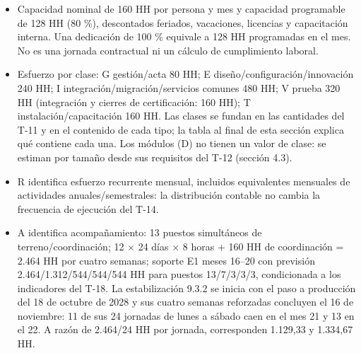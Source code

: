 \begin{itemize}
\item Capacidad nominal de 160 HH por persona y mes y capacidad programable de 128 HH (80 \%), descontados feriados, vacaciones, licencias y capacitación interna. Una dedicación de 100 \% equivale a 128 HH programadas en el mes. No es una jornada contractual ni un cálculo de cumplimiento laboral.
\item Esfuerzo por clase: G gestión/acta 80 HH; E diseño/configuración/innovación 240 HH; I integración/migración/servicios comunes 480 HH; V prueba 320 HH (integración y cierres de certificación: 160 HH); T instalación/capacitación 160 HH. Las clases se fundan en las cantidades del T-11 y en el contenido de cada tipo; la tabla al final de esta sección explica qué contiene cada una. Los módulos (D) no tienen un valor de clase: se estiman por tamaño desde sus requisitos del T-12 (sección 4.3).
\item R identifica esfuerzo recurrente mensual, incluidos equivalentes mensuales de actividades anuales/semestrales: la distribución contable no cambia la frecuencia de ejecución del T-14.
\item A identifica acompañamiento: 13 puestos simultáneos de terreno/coordinación; 12 \ensuremath{\times} 24 días \ensuremath{\times} 8 horas + 160 HH de coordinación = 2.464 HH por cuatro semanas; soporte E1 meses 16–20 con previsión 2.464/\allowbreak{}1.312/\allowbreak{}544/\allowbreak{}544/\allowbreak{}544 HH para puestos 13/\allowbreak{}7/\allowbreak{}3/\allowbreak{}3/\allowbreak{}3, condicionada a los indicadores del T-18. La estabilización 9.3.2 se inicia con el paso a producción del 18 de octubre de 2028 y sus cuatro semanas reforzadas concluyen el 16 de noviembre: 11 de sus 24 jornadas de lunes a sábado caen en el mes 21 y 13 en el 22. A razón de 2.464/24 HH por jornada, corresponden 1.129,33 y 1.334,67 HH.

\end{itemize}
